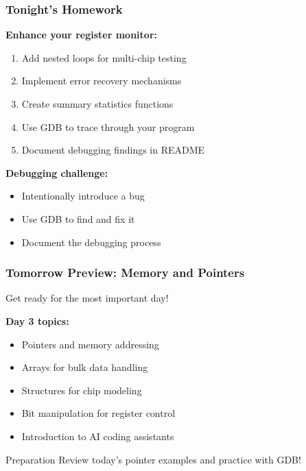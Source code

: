 \documentclass{beamer}
\begin{document}
\begin{frame}
\frametitle{Tonight's Homework}
\textbf{Enhance your register monitor:}
\begin{enumerate}
    \item Add nested loops for multi-chip testing
    \item Implement error recovery mechanisms
    \item Create summary statistics functions
    \item Use GDB to trace through your program
    \item Document debugging findings in README
\end{enumerate}

\vspace{0.5cm}
\textbf{Debugging challenge:}
\begin{itemize}
    \item Intentionally introduce a bug
    \item Use GDB to find and fix it
    \item Document the debugging process
\end{itemize}
\end{frame}

\begin{frame}
\frametitle{Tomorrow Preview: Memory and Pointers}
\begin{center}
\Large Get ready for the most important day!
\end{center}

\textbf{Day 3 topics:}
\begin{itemize}
    \item Pointers and memory addressing
    \item Arrays for bulk data handling
    \item Structures for chip modeling
    \item Bit manipulation for register control
    \item Introduction to AI coding assistants
\end{itemize}

\vspace{0.5cm}
\begin{alertblock}{Preparation}
Review today's pointer examples and practice with GDB!
\end{alertblock}
\end{frame}
\end{document}
